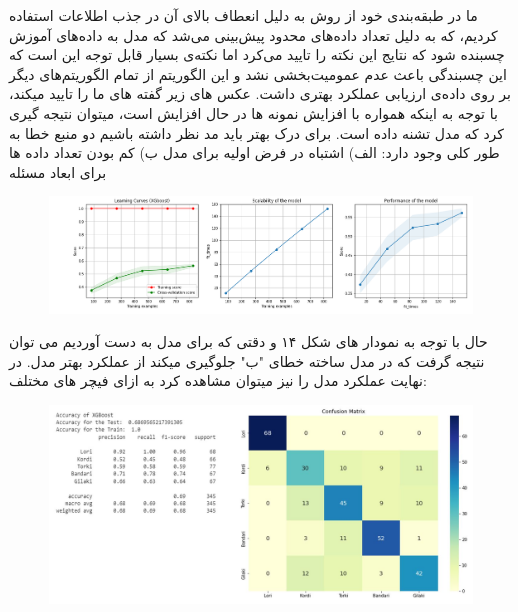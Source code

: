 \documentclass[10pt,onecolumn,a4paper]{article}
\begin{document}
ما در طبقه‌بندی خود از روش  به دلیل انعطاف بالای آن در جذب اطلاعات استفاده کردیم، که به دلیل تعداد داده‌های محدود پیش‌بینی می‌شد که مدل به داده‌های آموزش چسبنده شود که نتایج این نکته را تایید می‌کرد اما نکته‌ی بسیار قابل توجه این است که این چسبندگی باعث عدم عمومیت‌بخشی نشد و این الگوریتم از تمام الگوریتم‌های دیگر بر روی داده‌ی ارزیابی عملکرد بهتری داشت.  عکس های زیر گفته های ما را تایید میکند، با توجه به اینکه   همواره با افزایش نمونه ها در حال افزایش است، میتوان نتیجه گیری کرد که مدل تشنه داده است.
برای درک بهتر باید مد نظر داشته باشیم دو منبع خطا به طور کلی وجود دارد:
الف) اشتباه در فرض اولیه برای مدل
ب) کم بودن تعداد داده ها برای ابعاد مسئله

\begin{figure}[h!]
        \centering
        \includegraphics[scale=0.4]{g.png}
        \caption{  }  
    \end{figure}

حال با توجه به نمودار های شکل ۱۴ و دقتی که برای مدل به دست آوردیم می توان نتیجه گرفت که در 
مدل ساخته خطای "ب" جلوگیری میکند از عملکرد بهتر مدل. در نهایت عملکرد مدل را نیز میتوان مشاهده کرد به ازای فیچر های مختلف:


\begin{figure}[h!]
        \centering
        \includegraphics[scale=0.35]{h.JPG}
        \caption{  }  
    \end{figure}
\end{document}
